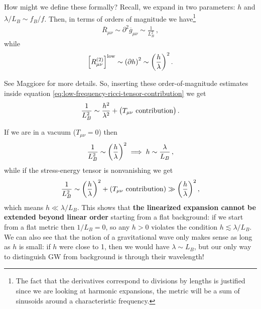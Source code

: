 \documentclass[main.tex]{subfiles}
\begin{document}
How might we define these formally?
Recall, we expand in two parameters: \(h\) and \(\lambda / L_B \sim  f_B / f\). Then, in terms of orders of magnitude we have\footnote{The fact that the derivatives correspond to divisions by lengths is justified since we are looking at harmonic expansions, the metric will be a sum of sinusoids around a characteristic frequency.} 
%
\begin{align}
\overline{R}_{\mu \nu } \sim \partial^2 \overline{g}_{\mu \nu } \sim \frac{1}{L_B^2} 
\,,
\end{align}
%
while 
%
\begin{align}
\qty[R^{(2)}_{\mu \nu }]^{\text{low}} \sim \qty(\partial h)^2
 \sim \qty(\frac{h}{\lambda })^2
\,.
\end{align}

See Maggiore \cite[pag.\ 31]{maggioreGravitationalWavesVolume2007} for more details. 
So, inserting these order-of-magnitude estimates inside equation \eqref{eq:low-frequency-ricci-tensor-contribution} we get
%
\begin{align}
\frac{1}{L_B^2} \sim \frac{h^2}{\lambda^2} + \qty(T_{\mu \nu } \text{ contribution})
\,.
\end{align}

If we are in a vacuum (\(T_{\mu \nu }=0\)) then
%
\begin{align}
\frac{1}{L_B^2} \sim \qty(\frac{h}{\lambda })^2
\implies h \sim \frac{\lambda }{L_B}
\,,
\end{align}
%
while if the stress-energy tensor is nonvanishing we get
%
\begin{align}
\frac{1}{L_B^2} \sim \qty(\frac{h}{\lambda })^2 + (T_{\mu \nu } \text{ contribution}) \gg \qty(\frac{h}{\lambda })^2
\,,
\end{align}
%
which means \(h \ll \lambda / L_B\). This shows that \textbf{the linearized expansion cannot be extended beyond linear order} starting from a flat background: if we start from a flat metric then \(1/L_B = 0\), so any \(h > 0\) violates the condition \(h \lesssim \lambda / L_B\).
We can also see that the notion of a gravitational wave only makes sense as long as \(h\) is small: if \(h\) were close to 1, then we would have \(\lambda \sim L_B\), but our only way to distinguish GW from background is through their wavelength! 

\end{document}
